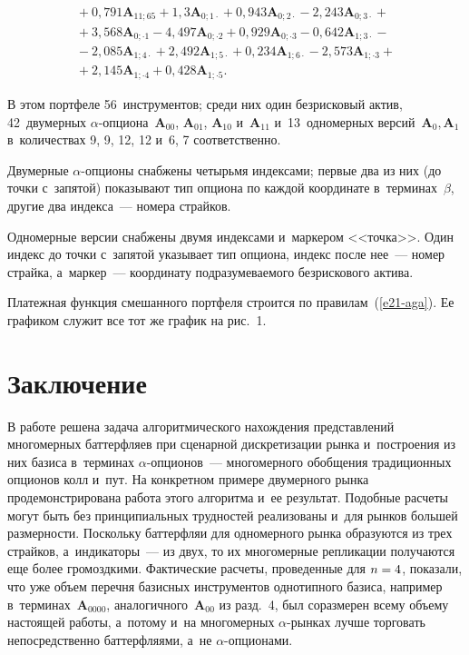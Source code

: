 \begin{multicols}{2}
\noindent
\begin{multline*}
{}+ 0{,}791\bm{A}_{11;65} + 1{,}3\bm{A}_{0;1\cdot} + 0{,}943\bm{A}_{0;2\cdot} - 2{,}243\bm{A}_{0;3\cdot} +{}\\
{}+ 3{,}568\bm{A}_{0;\cdot 1} - 4{,}497\bm{A}_{0;\cdot 2} + 0{,}929\bm{A}_{0;\cdot 3} - 0{,}642\bm{A}_{1;3\cdot} - {}\\
{}-
2{,}085\bm{A}_{1;4\cdot} + 2{,}492\bm{A}_{1;5\cdot} + 0{,}234\bm{A}_{1;6\cdot} - 
2{,}573\bm{A}_{1;\cdot 3} +{}\\
{}+ 2{,}145\bm{A}_{1;\cdot 4} + 0{,}428\bm{A}_{1;\cdot 5}. 
  \end{multline*}
  
  \vspace*{-2pt}
  
\noindent
  В этом портфеле 56~инструментов; среди них один безрисковый актив, 
42~двумерных $\alpha$-оп\-ци\-она~$\bm{A}_{00}$, $\bm{A}_{01}$, $\bm{A}_{10}$ 
и~$\bm{A}_{11}$ и~13~одномерных версий~$\bm{A}_0, \bm{A}_1$ в~количествах 
9, 9, 12, 12 и~6, 7 соответственно. 
  
  Двумерные $\alpha$-оп\-ци\-оны снабжены четырьмя индексами; первые два из 
них (до точки с~запятой) показывают тип опциона по каждой координате 
в~терминах~$\beta$, другие два индекса~--- номера страй\-ков. 
  
  Одномерные версии снабжены двумя индексами и~маркером <<точка>>. 
Один индекс до точки с~запятой указывает тип опциона, индекс после нее~---  
номер страй\-ка, а~маркер~--- координату под\-ра\-зу\-ме\-ва\-емо\-го безрискового 
актива.
  
  Платежная функция смешанного портфеля строится по  
правилам~(\ref{e21-aga}). Ее графиком служит все тот же график на рис.~1. 
  
  \section{Заключение }
  
  В работе решена задача алгоритмического на\-хож\-де\-ния пред\-став\-ле\-ний 
многомерных баттерфляев при сценарной дискретизации рынка и~\mbox{по\-стро\-ения} 
из них базиса в~терминах $\alpha$-оп\-ци\-онов~--- многомерного обобщения 
традиционных опционов колл и~пут. На конкретном примере двумерного рынка 
продемонстрирована работа этого алгоритма и~ее результат. Подобные расчеты 
могут быть без принципиальных трудностей реализованы и~для рынков 
большей размерности. Поскольку бат\-тер\-фляи для одномерного рынка 
образуются из трех страй\-ков, а~индикаторы~--- из двух, то их многомерные 
реп\-ли\-ка\-ции получаются еще более громоздкими. Фактические расчеты, 
проведенные для $n\hm=4$, показали, что уже объем перечня базисных 
инструментов однотипного базиса, например в~терминах~$\bm{A}_{0000}$, 
аналогичного~$\bm{A}_{00}$ из разд.~4, был соразмерен всему объему 
на\-сто\-ящей работы, а~потому и~на многомерных $\alpha$-рын\-ках лучше торговать 
непосредственно бат\-тер\-фля\-ями, а~не $\alpha$-оп\-ци\-онами. 
  

\end{multicols}
